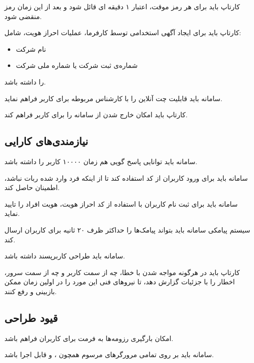\documentclass[12pt,svgnames,oneside]{book}
\newcounter{itemadded}
\newcommand{\addeditem}{%
	\addtocounter{enumi}{-1}%
	\stepcounter{itemadded}
	\let\LaTeXStandardLabelEnumi\labelenumi%
	\addtocounter{enumi}{1}
	\renewcommand{\labelenumi}{\arabic{enumi}\lr{R}.}%
	\item 
	\let\labelenumi\LaTeXStandardLabelEnumi%
}%
\let\LaTeXStandardEnumerateBegin\enumerate
\let\LaTeXStandardEnumerateEnd\endenumerate
\renewenvironment{enumerate}{%
	\LaTeXStandardEnumerateBegin%
	\setcounter{itemadded}{0}
}{%
	\LaTeXStandardEnumerateEnd%
}%
\begin{document}
\begin{enumerate}
\begin{enumerate}
	\item[2.26\lr{.R}]									
کارتاپ باید برای هر رمز موقت، اعتبار ۱ دقیقه ای قائل شود و بعد از این زمان رمز منقضی شود.
\end{enumerate}

\addeditem							
کارتاپ باید برای ایجاد آگهی استخدامی توسط کارفرما، عملیات احراز هویت، شامل: 
\begin{itemize}
	\item نام شرکت
	\item شماره‌ی ثبت شرکت یا شماره ملی شرکت
\end{itemize}							را داشته باشد.

\addeditem					
سامانه باید قابلیت چت آنلاین را با کارشناس مربوطه برای کاربر فراهم نماید. 
\addeditem							
	کارتاپ باید امکان خارج شدن از سامانه را برای کاربر فراهم کند. 
	
\end{enumerate}
		\subsection{نیازمندی‌های کارایی}
			\begin{enumerate}
				\item					سامانه باید توانایی پاسخ گویی هم زمان ۱۰۰۰۰ کاربر را داشته باشد.
					\item					سامانه باید برای ورود کاربران از کد \lr{CAPCHA}  استفاده کند تا از اینکه فرد وارد شده ربات نباشد، اطمینان حاصل کند.
					\item					سامانه باید برای ثبت نام کاربران با استفاده از کد احراز هویت، هویت افراد را تایید نماید.
					\item					سیستم پیامکی سامانه باید بتواند پیامک‌ها را حداکثر ظرف ۲۰ ثانیه برای کاربران ارسال کند.
					\item					سامانه باید طراحی کاربرپسند داشته باشد.
					\item					کارتاپ باید در هرگونه مواجه شدن با خطا، چه از سمت کاربر و چه از سمت سرور، اخطار را با جزئیات گزارش دهد، تا نیروهای فنی این مورد را در اولین زمان ممکن بازبینی و رفع کنند.
				\end{enumerate}
		\subsection{قیود طراحی}
		\begin{enumerate}
			\item				امکان بارگیری رزومه‌ها به فرمت  برای کاربران فراهم باشد.
				\item				سامانه باید بر روی تمامی مرورگر‌های مرسوم همچون
				،
			 و
			  قابل اجرا باشد.
		\end{enumerate}
\end{document}
